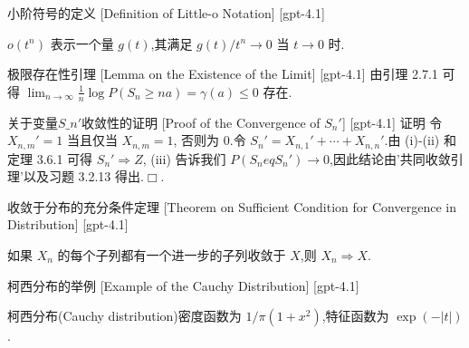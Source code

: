 \documentclass[UTF8]{ctexart}
\begin{document}
    
    
    \begin{dfn}
        {小阶符号的定义}
        [Definition of Little-o Notation]
        [gpt-4.1]
        
$o(t^n)$ 表示一个量 $g(t)$,其满足 $g(t) / t^n \to 0$ 当 $t \to 0$ 时.

    \end{dfn}
    
    
    
    \begin{lma}
        {极限存在性引理}
        [Lemma on the Existence of the Limit]
        [gpt-4.1]
        由引理 2.7.1 可得 $\operatorname*{lim}_{n \to \infty} \frac{1}{n} \log P ( S_{n} \geq n a ) = \gamma ( a ) \leq 0$ 存在.
    \end{lma}
    
    
    
    \begin{prf}
        {关于变量$S\_n'$收敛性的证明}
        [Proof of the Convergence of $S_n'$]
        [gpt-4.1]
        证明 令 $X_{n,m}' = 1$ 当且仅当 $X_{n,m} = 1$, 否则为 $0$.令 $S_n' = X_{n,1}' + \cdots + X_{n,n}'$.由 (i)-(ii) 和定理 3.6.1 可得 $S_n' \Rightarrow Z$, (iii) 告诉我们 $P(S_n 
eq S_n') \to 0$,因此结论由'共同收敛引理'以及习题 3.2.13 得出.$\Box$.
    \end{prf}
    
    
    
    \begin{thm}
        {收敛于分布的充分条件定理}
        [Theorem on Sufficient Condition for Convergence in Distribution]
        [gpt-4.1]
        
如果 $X_n$ 的每个子列都有一个进一步的子列收敛于 $X$,则 $X_n \Rightarrow X$.

    \end{thm}
    
    
    
    \begin{xmp}
        {柯西分布的举例}
        [Example of the Cauchy Distribution]
        [gpt-4.1]
        
柯西分布(Cauchy distribution)密度函数为 $1/\pi (1 + x^2)$,特征函数为 $\exp(-|t|)$.

    \end{xmp}
    
\end{document}
